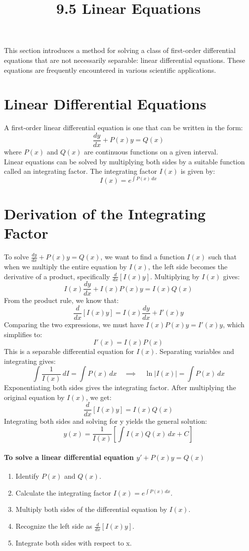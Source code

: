 \documentclass{article}
\title{9.5 Linear Equations}
\date{}
\begin{document}
\maketitle
This section introduces a method for solving a class of first-order differential equations that are not necessarily separable: linear differential equations. These equations are frequently encountered in various scientific applications.

\section*{Linear Differential Equations}

A first-order linear differential equation is one that can be written in the form:
\[\frac{dy}{dx} + P(x)y = Q(x)\]
where $P(x)$ and $Q(x)$ are continuous functions on a given interval. 
\\Linear equations can be solved by multiplying both sides by a suitable function called an integrating factor. The integrating factor $I(x)$ is given by:
\[I(x) = e^{\int P(x) \, dx}\]

\section*{Derivation of the Integrating Factor}
To solve $\frac{dy}{dx} + P(x)y = Q(x)$, we want to find a function $I(x)$ such that when we multiply the entire equation by $I(x)$, the left side becomes the derivative of a product, specifically $\frac{d}{dx}[I(x)y]$. Multiplying by $I(x)$ gives:
\[I(x)\frac{dy}{dx} + I(x)P(x)y = I(x)Q(x)\]
From the product rule, we know that:
\[\frac{d}{dx}[I(x)y] = I(x)\frac{dy}{dx} + I'(x)y\]
Comparing the two expressions, we must have $I(x)P(x)y = I'(x)y$, which simplifies to:
\[I'(x) = I(x)P(x)\]
This is a separable differential equation for $I(x)$. Separating variables and integrating gives:
\[\int \frac{1}{I(x)} \, dI = \int P(x) \, dx \quad \implies \quad \ln|I(x)| =\int P(x)\, dx\]
Exponentiating both sides gives the integrating factor. After multiplying the original equation by $I(x)$, we get:
\[\frac{d}{dx}[I(x)y] = I(x)Q(x)\]
Integrating both sides and solving for y yields the general solution:
\[y(x) = \frac{1}{I(x)} \left[ \int I(x)Q(x) \, dx + C \right]\]

\paragraph{To solve a linear differential equation $y'+P(x)y=Q(x)$}
\begin{enumerate}
  \item Identify $P(x)$ and $Q(x)$.
  \item Calculate the integrating factor $I(x) = e^{\int P(x) \, dx}$.
  \item Multiply both sides of the differential equation by $I(x)$.
  \item Recognize the left side as $\frac{d}{dx}[I(x)y]$.
  \item Integrate both sides with respect to x.
\end{enumerate}
\end{document}
